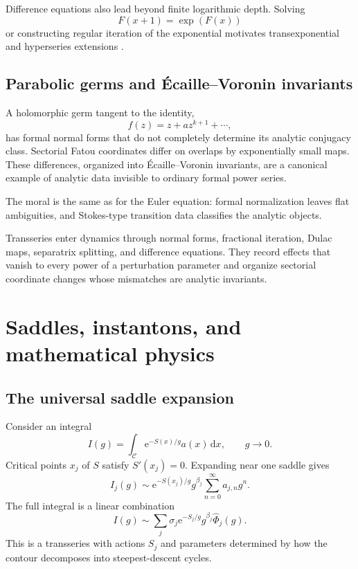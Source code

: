 \documentclass[11pt,oneside]{book}
\theoremstyle{definition}
\theoremstyle{remark}
\newcommand{\e}{\mathrm{e}}
\newcommand{\dd}{\,\mathrm{d}}
\newcommand{\phihat}{\widehat{\Phi}}
\begin{document}
Difference equations also lead beyond finite logarithmic depth. Solving
\[
  F(x+1)=\exp(F(x))
\]
or constructing regular iteration of the exponential motivates
transexponential and hyperseries extensions
\cite{SchmelingThesis,PadgettTransexponential,vanDenDriesHoevenKaplan}.

\section{Parabolic germs and \'Ecaille--Voronin invariants}

A holomorphic germ tangent to the identity,
\[
  f(z)=z+az^{k+1}+\cdots,
\]
has formal normal forms that do not completely determine its analytic conjugacy
class. Sectorial Fatou coordinates differ on overlaps by exponentially small
maps. These differences, organized into \'Ecaille--Voronin invariants, are a
canonical example of analytic data invisible to ordinary formal power series.

The moral is the same as for the Euler equation: formal normalization leaves
flat ambiguities, and Stokes-type transition data classifies the analytic
objects.

\begin{summarybox}
Transseries enter dynamics through normal forms, fractional iteration, Dulac
maps, separatrix splitting, and difference equations. They record effects that
vanish to every power of a perturbation parameter and organize sectorial
coordinate changes whose mismatches are analytic invariants.
\end{summarybox}


\chapter{Saddles, instantons, and mathematical physics}
\label{ch:physics}

\section{The universal saddle expansion}

Consider an integral
\begin{equation}
  I(g)=\int_{\mathcal C}\e^{-S(x)/g}a(x)\dd x,
  \qquad g\to0.
  \label{eq:semiclassical-integral}
\end{equation}
Critical points $x_j$ of $S$ satisfy $S'(x_j)=0$. Expanding near one saddle
gives
\[
  I_j(g)\sim
  \e^{-S(x_j)/g}g^{\beta_j}
  \sum_{n=0}^{\infty}a_{j,n}g^n.
\]
The full integral is a linear combination
\begin{equation}
  I(g)\sim
  \sum_j\sigma_j
  \e^{-S_j/g}g^{\beta_j}\phihat_j(g).
  \label{eq:saddle-transseries}
\end{equation}
This is a transseries with actions $S_j$ and parameters determined by how the
contour decomposes into steepest-descent cycles.
\end{document}
